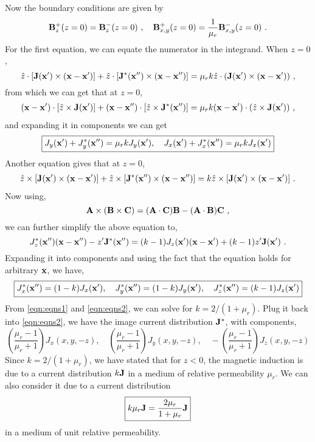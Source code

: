 \documentclass[12pt]{article}
\newcommand{\x}{{\bf x}}
\newcommand{\B}{{\bf B}}
\newcommand{\bJ}{{\bf J}}
\newcommand{\A}{{\bf A}}
\begin{document}
Now the boundary conditions are given by
\begin{equation}
    \B^+_z(z = 0) = \B^-_z(z = 0)~, \quad \B^+_{x,y}(z = 0) = \frac{1}{\mu_r} \B^-_{x,y}(z = 0)~.
\end{equation}
For the first equation, we can equate the numerator in the integrand. When $z = 0$,
\begin{equation}
    \hat{z} \cdot [\bJ(\x')  \times (\x - \x')] + \hat{z} \cdot [\bJ^*(\x'')  \times (\x - \x'')] = \mu_r k \hat{z} \cdot (\bJ(\x') \times (\x - \x'))~,
\end{equation}
from which we can get that at $z = 0$,
\begin{align}
    (\x - \x')\cdot [\hat{z} \times \bJ(\x')] + (\x - \x'') \cdot [\hat{z} \times \bJ^*(\x'')] = \mu_r k (\x - \x') \cdot (\hat{z}  \times \bJ(\x'))~,
\end{align}
and expanding it in components we can get
\begin{equation}\label{eqn:eqns1}
    \boxed{
     J_y(\x') + J^*_y(\x'') = \mu_r k J_y(\x'), \quad J_x(\x') + J^*_x(\x'') = \mu_r k J_x(\x')}
\end{equation}
Another equation gives that at $z = 0$,
\begin{align}
    \hat{z} \times [\bJ(\x') \times (\x - \x')] + \hat{z} \times [\bJ^*(\x'') \times (\x - \x'')] = k \hat{z} \times [\bJ(\x') \times (\x - \x')]~.
\end{align}
Now using,
\begin{equation}
    \A \times (\B \times {\bf C}) = (\A \cdot {\bf C}) \B - (\A \cdot \B) {\bf C}~,
\end{equation}
we can further simplify the above equation to,
\begin{equation}
    J_z^*(\x'')(\x - \x'') - z' \bJ^*(\x'') =(k-1) J_z(\x') (\x - \x') + (k-1) z'  \bJ(\x')~.
\end{equation}
Expanding it into components and using the fact that the equation holds for arbitrary $\x$, we have,
\begin{equation}\label{eqn:eqns2}
    \boxed{
    J_x^*(\x'') = (1-k) J_x(\x'), \quad J_y^*(\x'') = (1-k) J_y(\x'), \quad J_z^*(\x'') = (k-1) J_z(\x')}
\end{equation}
From \eqref{eqn:eqns1} and \eqref{eqn:eqns2}, we can solve for $k = 2/(1 + \mu_r)$. Plug it back into \eqref{eqn:eqns2}, we have the image current distribution $\bJ^*$, with components,
\begin{equation}\nonumber
    \boxed{
        \left(\frac{\mu_r - 1}{\mu_r + 1}\right) J_x(x,y,-z), \quad  \left(\frac{\mu_r - 1}{\mu_r + 1}\right) J_y(x,y,-z), \quad  -\left(\frac{\mu_r - 1}{\mu_r + 1}\right) J_z(x,y,-z)
    }
\end{equation}
Since $k = 2/(1 + \mu_r)$, we have stated that for $z < 0$, the magnetic induction is due to a current distribution $k \bJ$ in a medium of relative permeability $\mu_r$. We can also consider it due to a current distribution
\begin{equation}
    \boxed{
    k\mu_r \bJ = \frac{2\mu_r}{1 + \mu_r} \bJ
    }
\end{equation}
in a medium of unit relative permeability.
\end{document}
